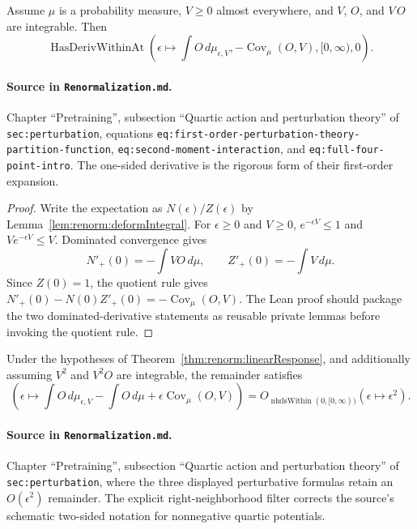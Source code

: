\begin{theorem}
\label{thm:renorm:linearResponse}
Assume $\mu$ is a probability measure, $V\geq0$ almost everywhere, and $V$, $O$, and $V\,O$ are
integrable.  Then
\[
 \operatorname{HasDerivWithinAt}\left(
   \epsilon\mapsto\int O\,d\mu_{\epsilon,V},
   -\operatorname{Cov}_\mu(O,V),[0,\infty),0\right).
\]

\paragraph{Source in \texttt{Renormalization.md}.}
Chapter ``Pretraining'', subsection ``Quartic action and perturbation theory'' of
\texttt{sec:perturbation}, equations \texttt{eq:first-order-perturbation-theory-partition-function},
\texttt{eq:second-moment-interaction}, and \texttt{eq:full-four-point-intro}.  The one-sided
derivative is the rigorous form of their first-order expansion.
\end{theorem}

\begin{proof}
Write the expectation as $N(\epsilon)/Z(\epsilon)$ by
Lemma~\ref{lem:renorm:deformIntegral}.  For $\epsilon\geq0$ and $V\geq0$,
$e^{-\epsilon V}\leq1$ and $V e^{-\epsilon V}\leq V$.  Dominated convergence gives
\[
 N'_+(0)=-\int VO\,d\mu,\qquad Z'_+(0)=-\int V\,d\mu.
\]
Since $Z(0)=1$, the quotient rule gives
$N'_+(0)-N(0)Z'_+(0)=-\operatorname{Cov}_\mu(O,V)$.
The Lean proof should package the two dominated-derivative statements as reusable private lemmas
before invoking the quotient rule.
\end{proof}

\begin{theorem}
\label{thm:renorm:quadraticResponse}
Under the hypotheses of Theorem~\ref{thm:renorm:linearResponse}, and additionally assuming
$V^2$ and $V^2O$ are integrable, the remainder satisfies
\[
 \left(\epsilon\mapsto
   \int O\,d\mu_{\epsilon,V}-\int O\,d\mu
   +\epsilon\operatorname{Cov}_\mu(O,V)\right)
 =O_{\operatorname{nhdsWithin}(0,[0,\infty))}(\epsilon\mapsto\epsilon^2).
\]

\paragraph{Source in \texttt{Renormalization.md}.}
Chapter ``Pretraining'', subsection ``Quartic action and perturbation theory'' of
\texttt{sec:perturbation}, where the three displayed perturbative formulas retain an
$O(\epsilon^2)$ remainder.  The explicit right-neighborhood filter corrects the source's schematic
two-sided notation for nonnegative quartic potentials.
\end{theorem}

